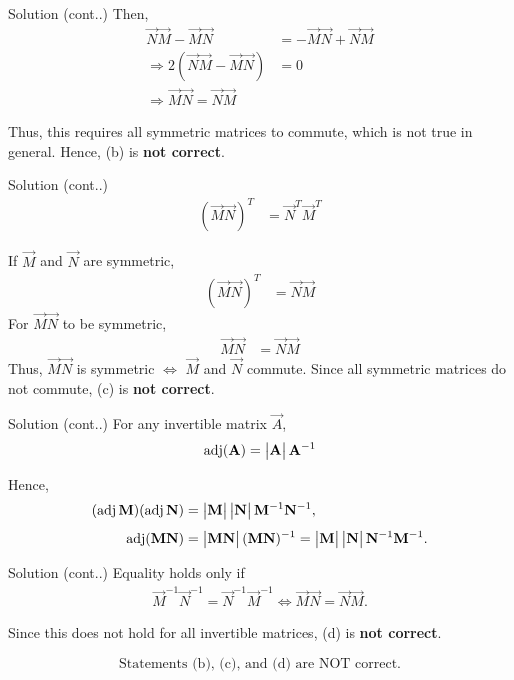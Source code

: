 \documentclass{beamer}
\begin{document}
\begin{frame}{Solution (cont..)}
Then,
\begin{align}
\vec{N}\vec{M} - \vec{M}\vec{N} &= -\vec{M}\vec{N} + \vec{N}\vec{M} \\
\Rightarrow 2(\vec{N}\vec{M} - \vec{M}\vec{N}) &= 0 \\
\Rightarrow \vec{M}\vec{N} = \vec{N}\vec{M}
\end{align}

Thus, this requires all symmetric matrices to commute, which is not true in general.  
Hence, (b) is \textbf{not correct}.
\end{frame}

\begin{frame}{Solution (cont..)}
\begin{align}
(\vec{M}\vec{N})^T &= \vec{N}^T \vec{M}^T
\end{align}

If $\vec{M}$ and $\vec{N}$ are symmetric,
\begin{align}
(\vec{M}\vec{N})^T &= \vec{N}\vec{M}
\end{align}
For $\vec{M}\vec{N}$ to be symmetric,  
\begin{align}
\vec{M}\vec{N} &= \vec{N}\vec{M}
\end{align}
Thus, $\vec{M}\vec{N}$ is symmetric $\iff$ $\vec{M}$ and $\vec{N}$ commute.  
Since all symmetric matrices do not commute, (c) is \textbf{not correct}.
\end{frame}

\begin{frame}{Solution (cont..)}
For any invertible matrix $\vec{A}$,
\begin{align}
\operatorname{adj}(\mathbf{A}) = \begin{vmatrix}\mathbf{A}\end{vmatrix} \mathbf{A}^{-1}
\end{align}

Hence,
\begin{align}
(\operatorname{adj}\mathbf{M})(\operatorname{adj}\mathbf{N}) &= \begin{vmatrix}\mathbf{M}\end{vmatrix}\begin{vmatrix}\mathbf{N}\end{vmatrix}\mathbf{M}^{-1}\mathbf{N}^{-1}, \\[4pt]
\operatorname{adj}(\mathbf{M}\mathbf{N}) &= \begin{vmatrix}\mathbf{M}\mathbf{N}\end{vmatrix}(\mathbf{M}\mathbf{N})^{-1} = \begin{vmatrix}\mathbf{M}\end{vmatrix}\begin{vmatrix}\mathbf{N}\end{vmatrix} \mathbf{N}^{-1}\mathbf{M}^{-1}.
\end{align}
\end{frame}

\begin{frame}{Solution (cont..)}
Equality holds only if  
\begin{align}
\vec{M}^{-1}\vec{N}^{-1} = \vec{N}^{-1}\vec{M}^{-1} \iff \vec{M}\vec{N} = \vec{N}\vec{M}.
\end{align}

Since this does not hold for all invertible matrices, (d) is \textbf{not correct}.

\[
\boxed{\text{Statements (b), (c), and (d) are NOT correct.}}
\]
\end{frame}
\end{document}
